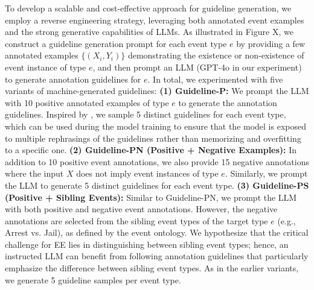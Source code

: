 To develop a scalable and cost-effective approach for guideline generation, we employ a reverse engineering strategy, leveraging both annotated event examples and the strong generative capabilities of LLMs. As illustrated in Figure X, we construct a guideline generation prompt for each event type $e$ by providing a few annotated examples $\{(X_i, Y_i)\}$ demonstrating the existence or non-existence of event instance of type $e$, and then prompt an LLM (GPT-4o in our experiment) to generate annotation guidelines for $e$. In total, we experimented with five variants of machine-generated guidelines:
\textbf{(1) Guideline-P:} We prompt the LLM with 10 positive annotated examples of type $e$ to generate the annotation guidelines. Inspired by \citet{sainz2024gollie}, we sample 5 distinct guidelines for each event type, which can be used during the model training to ensure that the model is exposed to multiple rephrasings of the guidelines rather than memorizing and overfitting to a specific one.
\textbf{(2) Guideline-PN (Positive + Negative Examples):} In addition to 10 positive event annotations, we also provide 15 negative annotations where the input $X$ does not imply event instances of type $e$. Similarly, we prompt the LLM to generate 5 distinct guidelines for each event type.
\textbf{(3) Guideline-PS (Positive + Sibling Events):} Similar to Guideline-PN, we prompt the LLM with both positive and negative event annotations. However, the negative annotations are selected from the sibling event types of the target type $e$ (e.g., Arrest vs. Jail), as defined by the event ontology. We hypothesize that the critical challenge for EE lies in distinguishing between sibling event types; hence, an instructed LLM can benefit from following annotation guidelines that particularly emphasize the difference between sibling event types. As in the earlier variants, we generate 5 guideline samples per event type.
